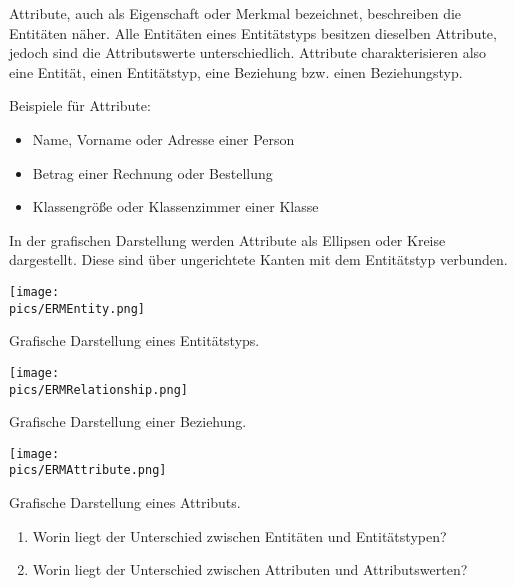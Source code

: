 \begin{tcolorbox}[title=Attribute]
	Attribute, auch als Eigenschaft oder Merkmal bezeichnet, beschreiben die Entitäten näher. Alle Entitäten eines Entitätstyps besitzen dieselben Attribute, jedoch sind die Attributswerte unterschiedlich. Attribute charakterisieren also eine Entität, einen Entitätstyp, eine Beziehung bzw. einen Beziehungstyp.

	Beispiele für Attribute:
	\begin{itemize}
		\item Name, Vorname oder Adresse einer Person
		\item Betrag einer Rechnung oder Bestellung
		\item Klassengröße oder Klassenzimmer einer Klasse
	\end{itemize}
	In der grafischen Darstellung werden Attribute als Ellipsen oder Kreise dargestellt. Diese sind über ungerichtete Kanten mit dem Entitätstyp verbunden.
\end{tcolorbox}
\begin{minipage}{\textwidth}
	\begin{minipage}{0.33\textwidth}
		\centering\texttt{[image: \\pics/ERMEntity.png]}

		Grafische Darstellung eines Entitätstyps.
	\end{minipage}
	\begin{minipage}{0.33\textwidth}
		\centering\texttt{[image: \\pics/ERMRelationship.png]}

		Grafische Darstellung einer Beziehung.
	\end{minipage}
	\begin{minipage}{0.33\textwidth}
		\centering\texttt{[image: \\pics/ERMAttribute.png]}

		Grafische Darstellung eines Attributs.
	\end{minipage}
\end{minipage}
\begin{Exercise}[title={Beantworte folgende Fragen.}, label=ERMFragen1]
	\begin{enumerate}
		\item Worin liegt der Unterschied zwischen Entitäten und Entitätstypen?
		\item Worin liegt der Unterschied zwischen Attributen und Attributswerten?
	\end{enumerate}
\end{Exercise}
